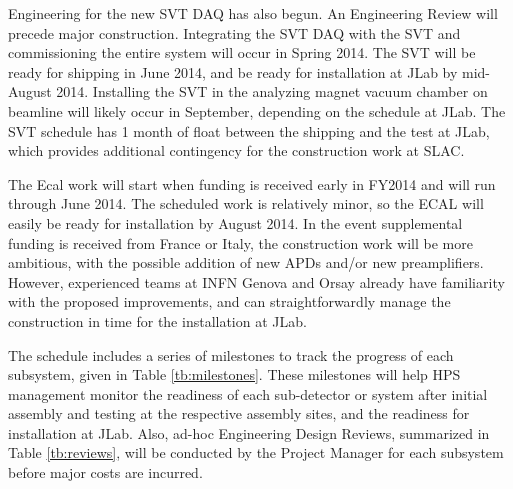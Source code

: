 Engineering for the new SVT DAQ has also begun. An Engineering Review will precede major construction.  Integrating the SVT DAQ with the SVT and commissioning the
entire system will occur in Spring 2014. The SVT will be ready for shipping in June 2014, and be ready for installation at JLab by mid-August 2014.  Installing 
the SVT in the analyzing magnet vacuum chamber on beamline will likely occur in September, depending on the schedule at JLab.  The SVT schedule has 1 month of 
float between the shipping and the test at JLab, which provides additional contingency for the construction work at SLAC.

The Ecal work will start when funding is received early in FY2014 and will run through June 2014. The scheduled work is relatively minor, so the ECAL will 
easily be ready for installation by August 2014. In the event supplemental funding is received from France or Italy, the construction work will be more ambitious, 
with the possible addition of new APDs and/or new preamplifiers. However, experienced teams at INFN Genova and Orsay already have familiarity with the proposed
improvements, and can straightforwardly manage the construction in time for the installation at JLab.

The schedule includes a series of milestones to track the progress of each subsystem, given in Table \ref{tb:milestones}. These milestones will help HPS management monitor the readiness of each 
sub-detector or system after initial assembly and testing at the respective assembly sites, and the readiness for installation at JLab.  
Also, ad-hoc Engineering Design Reviews, summarized in Table \ref{tb:reviews}, will be conducted by the Project Manager for each subsystem before major costs are incurred.

 
